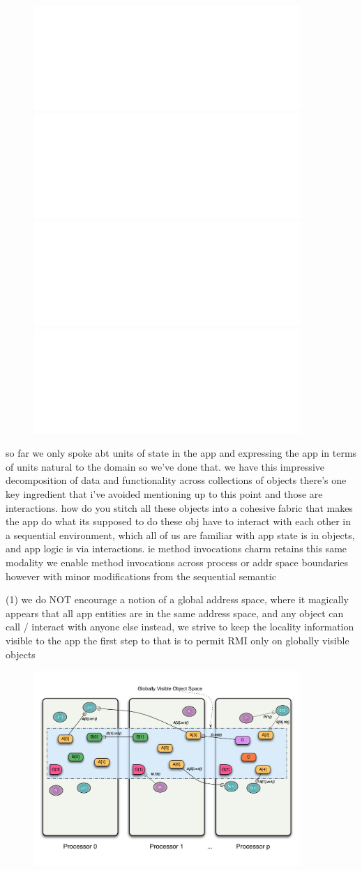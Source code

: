 \begin{frame}
  \frametitle{}
  \begin{figure}
	\includegraphics<1>[width=0.9\textwidth]{../figures/progmodel/07-obj-programmer-view.pdf}
	\includegraphics<2>[width=0.9\textwidth]{../figures/progmodel/05-parallelism-via-obj-collections.pdf}
	\includegraphics<3>[width=0.9\textwidth]{../figures/progmodel/08-seq-obj-methods.pdf}
	\includegraphics<4>[width=0.9\textwidth]{../figures/progmodel/09-rmi-synchronous.pdf}
  \end{figure}
so far we only spoke abt units of state in the app
and expressing the app in terms of units natural to the domain
so we've done that.
we have this impressive decomposition of data and functionality across collections of objects
there's one key ingredient that i've avoided mentioning up to this point
and those are interactions.
how do you stitch all these objects into a cohesive fabric that makes the app do what its supposed
to do
these obj have to interact with each other
% 
in a sequential environment, which all of us are familiar with
app state is in objects, and app logic is via interactions. ie method invocations
%
charm retains this same modality
we enable method invocations across process or addr space boundaries
%
however with minor modifications from the sequential semantic
\end{frame}


\begin{frame}
(1) we do NOT encourage a notion of a global address space, where it magically appears that
all app entities are in the same address space, and any object can call / interact with anyone else
instead, we strive to keep the locality information visible to the app
the first step to that is to permit RMI only on globally visible objects
  \begin{figure}\includegraphics[width=0.9\textwidth]{../figures/progmodel/10-rmi-notgas.pdf}\end{figure}
\end{frame}


